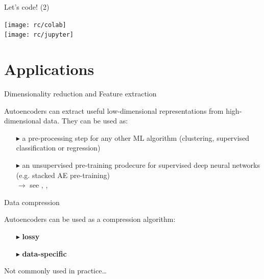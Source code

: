 \documentclass{beamer}
\begin{document}
  \begin{frame}{Let's code! (2)}

    \centering
    \texttt{[image: rc/colab]}\\
    \vspace{1cm}
    \texttt{[image: rc/jupyter]}


    
  \end{frame}

  \section{Applications}

  \begin{frame}{Dimensionality reduction and Feature extraction}

    Autoencoders can extract useful low-dimensional representations from high-dimensional data. They can be used as:

    \begin{itemize}
      \item[$\blacktriangleright$] a pre-processing step for any other ML algorithm (clustering, supervised classification or regression)
      \item[$\blacktriangleright$] an unsupervised pre-training prodecure for supervised deep neural networks (e.g. stacked AE pre-training)\\
      $\rightarrow$ see \cite{Hinton2006}, \cite{Erhan2010}, \cite{Vincent2010}
    \end{itemize}
    
  \end{frame}

  \begin{frame}{Data compression}
    
    Autoencoders can be used as a compression algorithm:

    \begin{itemize}
      \item[$\blacktriangleright$] \textbf{lossy}
      \item[$\blacktriangleright$] \textbf{data-specific}
    \end{itemize}

    Not commonly used in practice\dots

  \end{frame}  
\end{document}
